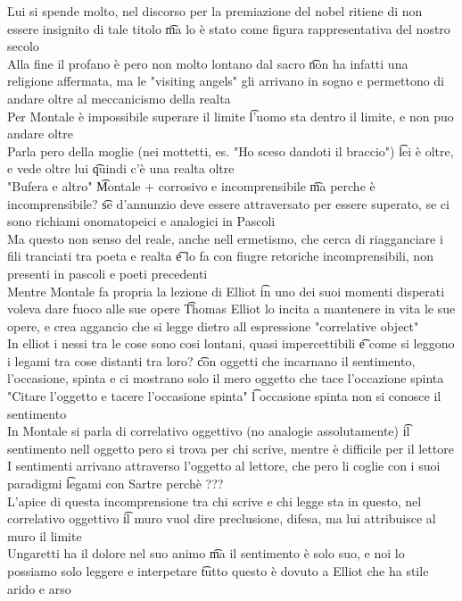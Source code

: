 \documentclass[12pt]{article}
\begin{document}
\v

Lui si spende molto, nel discorso per la premiazione del nobel ritiene di non essere insignito di tale titolo \t ma lo è stato come figura rappresentativa del nostro secolo \\
Alla fine il profano è pero non molto lontano dal sacro \t non ha infatti una religione affermata, ma le "visiting angels" gli arrivano in sogno e permettono di andare oltre al meccanicismo della realta \\
Per Montale è impossibile superare il limite \t l'uomo sta dentro il limite, e non puo andare oltre \\
Parla pero della moglie (nei mottetti, es. "Ho sceso dandoti il braccio") \t lei è oltre, e vede oltre lui \t quindi c'è una realta oltre \\
"Bufera e altro" \t Montale + corrosivo e incomprensibile \t ma perche è incomprensibile? \t se d'annunzio deve essere attraversato per essere superato, se ci sono richiami onomatopeici e analogici in Pascoli \\
Ma questo non senso del reale, anche nell ermetismo, che cerca di riagganciare i fili tranciati tra poeta e realta \t e lo fa con fiugre retoriche incomprensibili, non presenti in pascoli e poeti precedenti \\
Mentre Montale fa propria la lezione di Elliot \t in uno dei suoi momenti disperati voleva dare fuoco alle sue opere \t Thomas Elliot lo incita a mantenere in vita le sue opere, e crea aggancio che si legge dietro all espressione "correlative object" \\
In elliot i nessi tra le cose sono cosi lontani, quasi impercettibili \t e come si leggono i legami tra cose distanti tra loro? \t con oggetti che incarnano il sentimento, l'occasione, spinta e ci mostrano solo il mero oggetto che tace l'occazione spinta \\
"Citare l'oggetto e tacere l'occasione spinta" \t l occasione spinta non si conosce il sentimento \\
In Montale si parla di correlativo oggettivo (no analogie assolutamente) \t il sentimento nell oggetto pero si trova per chi scrive, mentre è difficile per il lettore \\
I sentimenti arrivano attraverso l'oggetto al lettore, che pero li coglie con i suoi paradigmi \t legami con Sartre perchè ??? \\
L'apice di questa incomprensione tra chi scrive e chi legge sta in questo, nel correlativo oggettivo \t il muro vuol dire preclusione, difesa, ma lui attribuisce al muro il limite \\
Ungaretti ha il dolore nel suo animo \t ma il sentimento è solo suo, e noi lo possiamo solo leggere e interpetare \t tutto questo è dovuto a Elliot che ha stile arido e arso
\end{document}
